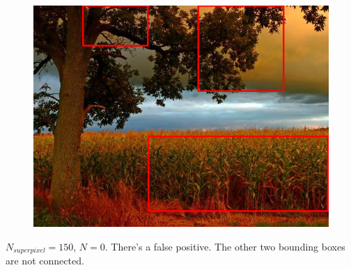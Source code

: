 \documentclass[a4paper,titlepaget]{article}
\begin{document}
\begin{figure}[htpb]
	\centering
	\includegraphics[width=.9\textwidth]{images/results/10fin}
\end{figure}
$N_{superpixel}=150$, $N=0$. There's a false positive. The other two bounding boxes are not connected.
\newpage
\end{document}
